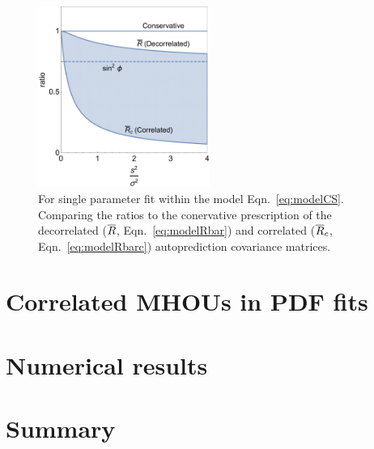 \begin{figure}[h]
  \begin{center}
      \includegraphics[width=0.5\textwidth]{correlations/plots/plot2.pdf}
    \caption{ For single parameter fit within the model Eqn.~\ref{eq:modelCS}.  Comparing the ratios to the conervative prescription of the decorrelated ($\overline{R}$, Eqn.~\ref{eq:modelRbar}) and correlated ($\overline{R}_c$, Eqn.~\ref{eq:modelRbarc}) autoprediction covariance matrices.  \label{fig:plot2}}
  \end{center}
\end{figure}

\section{Correlated MHOUs in PDF fits}
\label{sec:p3}

\section{Numerical results}
\label{sec:p4}

\section{Summary}
\label{sec:p5}
